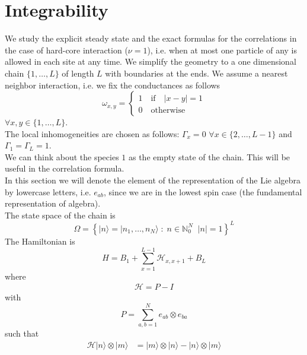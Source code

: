 \documentclass[11pt]{article}
\numberwithin{equation}{section}
\newcommand{\id}{I}
\newcommand{\twoj}{\nu}
\begin{document}
\section{Integrability}\label{sec4}
We study the explicit steady state and the exact formulas for the correlations in the case of hard-core interaction ($\twoj=1$), i.e. when at most one particle of any is allowed in each site at any time. We simplify the geometry to a one dimensional chain $\{1,\ldots,L\}$ of length $L$ with boundaries at the ends. We assume a nearest neighbor interaction, i.e. we fix the conductances as follows
\begin{equation}
\omega_{x,y}=\begin{cases}
    1\quad \text{if}\quad |x-y|=1\\
    0\quad \text{otherwise}
\end{cases}
\end{equation}
$\forall x,y\in \{1,\ldots,L\}$.\\
The local inhomogeneities are chosen as follows: $\Gamma_{x}=0$ $\forall x\in \{2,\ldots,L-1\}$ and $\Gamma_{1}=\Gamma_{L}=1$. \\
We can think about the species $1$ as the empty state of the chain. This will be useful in the correlation formula.\\
In this section we will denote the element of the representation of the Lie algebra by lowercase letters, i.e. $e_{ab}$, since we are in the lowest spin case (the fundamental representation of algebra). \\
The state space of the chain is 
\begin{equation}
	\Omega=\left\{|n\rangle=|n_{1},\ldots,n_{N}\rangle\;:\;n\in\mathbb{N}_0^N\;\;|n|=1\right\}^{L}
\end{equation} 
The Hamiltonian is
\begin{equation}\label{hamiltonian}
	H=B_{1}+\sum_{x=1}^{L-1}\mathcal{H}_{x,x+1}+B_{L}
\end{equation}
where
\begin{equation}
	\begin{split}
		\mathcal{H}=P-\id
	\end{split}
\end{equation}
with 
\begin{equation}
	P=\sum_{a,b=1}^Ne_{ab}\otimes e_{ba}
\end{equation} 
such that
\begin{equation}
	\begin{split}
		\mathcal{H}|n\rangle\otimes   |m\rangle&=|m\rangle \otimes |n\rangle-|n\rangle \otimes|m\rangle
	\end{split}
\end{equation}
\end{document}
